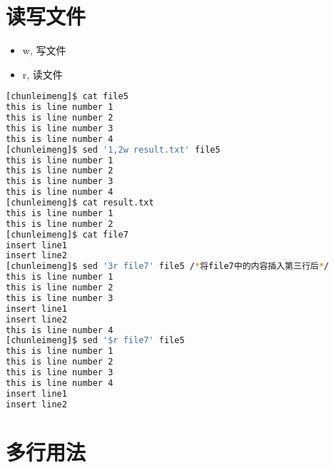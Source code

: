 \documentclass{article}
\begin{document}
\section{读写文件}
\begin{itemize}
	\item w, 写文件
	\item r, 读文件
\end{itemize}
\begin{lstlisting}[language=bash, caption={File}]
[chunleimeng]$ cat file5
this is line number 1
this is line number 2
this is line number 3
this is line number 4
[chunleimeng]$ sed '1,2w result.txt' file5
this is line number 1
this is line number 2
this is line number 3
this is line number 4
[chunleimeng]$ cat result.txt 
this is line number 1
this is line number 2
[chunleimeng]$ cat file7
insert line1
insert line2
[chunleimeng]$ sed '3r file7' file5 /*将file7中的内容插入第三行后*/
this is line number 1
this is line number 2
this is line number 3
insert line1
insert line2
this is line number 4
[chunleimeng]$ sed '$r file7' file5
this is line number 1
this is line number 2
this is line number 3
this is line number 4
insert line1
insert line2
\end{lstlisting}

\section{多行用法}
\end{document}
